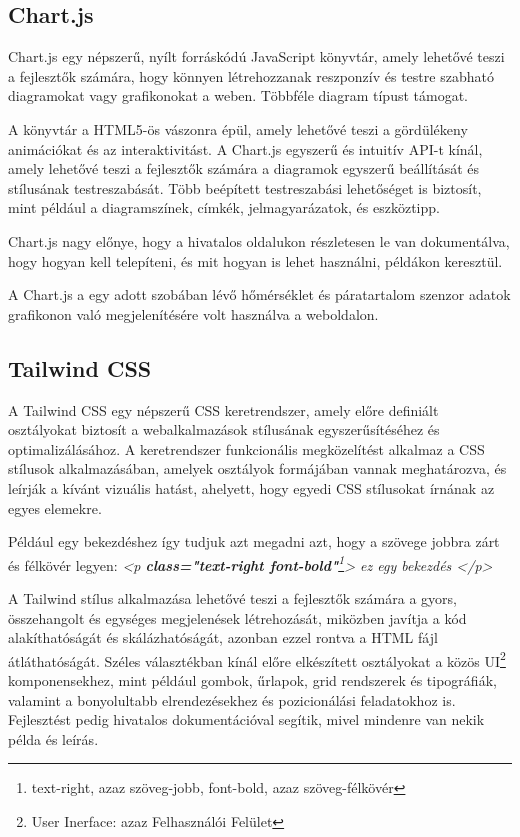 \documentclass[
]{thesis-ekf}
\theoremstyle{definition}
\theoremstyle{remark}
\begin{document}
	\subsection{Chart.js}
	Chart.js egy népszerű, nyílt forráskódú JavaScript könyvtár, amely lehetővé teszi a fejlesztők számára, hogy könnyen létrehozzanak reszponzív és testre szabható diagramokat vagy grafikonokat a weben. Többféle diagram típust támogat.
	
	A könyvtár a HTML5-ös vászonra épül, amely lehetővé teszi a gördülékeny animációkat és az interaktivitást. A Chart.js egyszerű és intuitív API-t kínál, amely lehetővé teszi a fejlesztők számára a diagramok egyszerű beállítását és stílusának testreszabását. Több beépített testreszabási lehetőséget is biztosít, mint például a diagramszínek, címkék, jelmagyarázatok, és eszköztipp.\cite{chartJS}
	
	Chart.js nagy előnye, hogy a hivatalos oldalukon részletesen le van dokumentálva, hogy hogyan kell telepíteni, és mit hogyan is lehet használni, példákon keresztül.
	
	A Chart.js a egy adott szobában lévő hőmérséklet és páratartalom szenzor adatok grafikonon való megjelenítésére volt használva a weboldalon.
	
	\subsection{Tailwind CSS}\label{tailwind}
	A Tailwind CSS egy népszerű CSS keretrendszer, amely előre definiált osztályokat biztosít a webalkalmazások stílusának egyszerűsítéséhez és optimalizálásához. A keretrendszer funkcionális megközelítést alkalmaz a CSS stílusok alkalmazásában, amelyek osztályok formájában vannak meghatározva, és leírják a kívánt vizuális hatást, ahelyett, hogy egyedi CSS stílusokat írnának az egyes elemekre.
	
	Például egy bekezdéshez így tudjuk azt megadni azt, hogy a szövege jobbra zárt és félkövér legyen: \emph{<p \textbf{class="text-right font-bold"}\footnote{text-right, azaz szöveg-jobb, font-bold, azaz szöveg-félkövér}> ez egy bekezdés </p>}
	
	A Tailwind stílus alkalmazása lehetővé teszi a fejlesztők számára a gyors, összehangolt és egységes megjelenések létrehozását, miközben javítja a kód alakíthatóságát és skálázhatóságát, azonban ezzel rontva a HTML fájl átláthatóságát. Széles választékban kínál előre elkészített osztályokat a közös UI\footnote{User Inerface: azaz Felhasználói Felület} komponensekhez, mint például gombok, űrlapok, grid rendszerek és tipográfiák, valamint a bonyolultabb elrendezésekhez és pozicionálási feladatokhoz is. Fejlesztést pedig hivatalos dokumentációval segítik, mivel mindenre van nekik példa és leírás.\cite{tailwind-docs}
	
\end{document}
